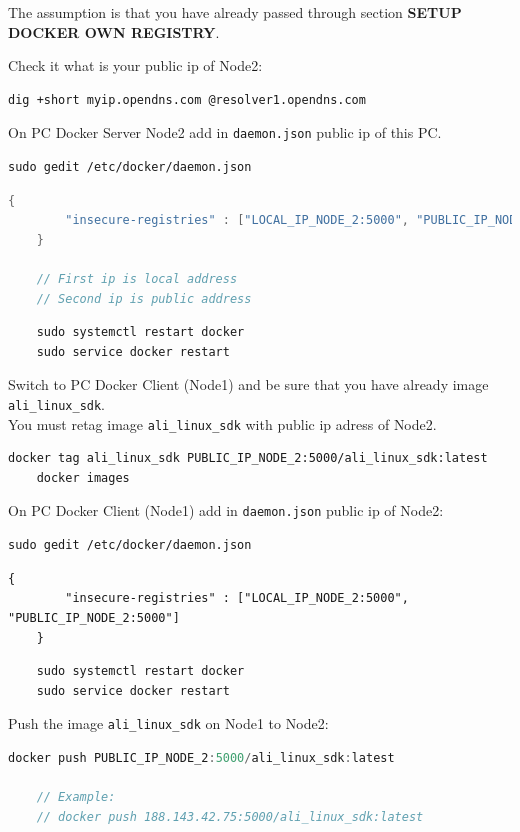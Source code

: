 \documentclass[12pt]{report}
\newcommand{\code}[1]{\texttt{#1}} %
\newcommand{\mygreen}[1]{{\color{my_green}#1}}
\newcommand{\myred}[1]{{\color{my_red}#1}}
\begin{document}
The assumption is that you have already passed through section \textbf{SETUP DOCKER OWN REGISTRY}.
\newline

Check it what is your public ip of \myred{Node2}:
\begin{lstlisting}[caption= Show public ip of Node2.]
dig +short myip.opendns.com @resolver1.opendns.com
\end{lstlisting}

On PC Docker Server \myred{Node2} add in \code{daemon.json} public ip of this PC.
\begin{lstlisting}
sudo gedit /etc/docker/daemon.json
\end{lstlisting}
\begin{lstlisting}[language=C, caption= Add in Node2 public ip of Node2.]
	{
		"insecure-registries" : ["LOCAL_IP_NODE_2:5000", "PUBLIC_IP_NODE_2:5000"]
	}
	
	// First ip is local address
	// Second ip is public address
\end{lstlisting}

\begin{lstlisting}
	sudo systemctl restart docker
	sudo service docker restart
\end{lstlisting}


Switch to PC Docker Client (\mygreen{Node1}) and be sure that you have already image \code{ali{\_}linux{\_}sdk}.\\
You must retag image \code{ali{\_}linux{\_}sdk} with public ip adress of \myred{Node2}.
\begin{lstlisting}[caption= Retag image with public ip.]
	docker tag ali_linux_sdk PUBLIC_IP_NODE_2:5000/ali_linux_sdk:latest
	docker images
\end{lstlisting}

On PC Docker Client (\mygreen{Node1}) add in \code{daemon.json} public ip of \myred{Node2}:
\begin{lstlisting}
sudo gedit /etc/docker/daemon.json
\end{lstlisting}
\begin{lstlisting}[caption= Add in Node1 public ip of Node2.]
	{
		"insecure-registries" : ["LOCAL_IP_NODE_2:5000", "PUBLIC_IP_NODE_2:5000"]
	}
\end{lstlisting}

\begin{lstlisting}
	sudo systemctl restart docker
	sudo service docker restart
\end{lstlisting}

Push the image \code{ali{\_}linux{\_}sdk} on  \mygreen{Node1} to \myred{Node2}:
\begin{lstlisting}[language=C, caption= Push from Node1 to Node2 with public ip.]
		docker push PUBLIC_IP_NODE_2:5000/ali_linux_sdk:latest

	// Example:
	// docker push 188.143.42.75:5000/ali_linux_sdk:latest
\end{lstlisting}
\end{document}

